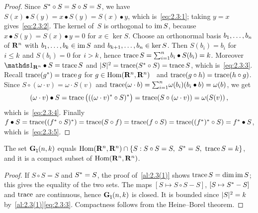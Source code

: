 \begin{proof}
    Since $S^{*} \circ S = S \circ S = S$, we have $S(x) \bullet S(y) = x \bullet S(y) =
    S(x) \bullet y$, which is~\eqref{eq:2.3:1}; taking $y = x$ gives~\eqref{eq:2.3:2}. The
    kernel of~$S$ is orthogonal to $\operatorname{im} S$, because $x \bullet S(y) = S(x) \bullet y = 0$ for $x
    \in \ker S$. Choose an orthonormal basis $b_1, \ldots, b_{n}$ of $\mathbf{R}^{n}$ with $b_1,
    \ldots, b_{k} \in \operatorname{im} S$ and $b_{k+1}, \ldots, b_{n} \in \ker S$. Then $S(b_i) =
    b_i$ for $i \le k$ and $S(b_i) = 0$ for $i > k$, hence $\operatorname{trace} S = {\textstyle\sum_{i=1}^{n}}
    b_i \bullet S(b_i) = k$. Moreover $\id{\R^{\adim}} \bullet S = \trace S$ and $|S|^2 =
    \operatorname{trace}(S^{*} \circ S) = \operatorname{trace} S$, which is~\eqref{eq:2.3:3}. Recall $\operatorname{trace}
    (g^{*}) = \operatorname{trace} g$ for $g \in \operatorname{Hom}(\mathbf{R}^{n},\mathbf{R}^{n})$~\cite[1.7.6]{Federer1969}
    and $\operatorname{trace}(g \circ h) = \operatorname{trace}(h \circ g)$. Since $S \circ (\omega \cdot v) = \omega \cdot
    S(v)$ and $\operatorname{trace}(\omega \cdot b) = {\textstyle\sum_{i=1}^{n}} \omega(b_i) (b_i \bullet b) =
    \omega(b)$, we get
    \begin{displaymath}
        (\omega \cdot v) \bullet S = \operatorname{trace} \big( ((\omega \cdot v)^{*} \circ
        S)^{*} \big) = \operatorname{trace}(S \circ (\omega \cdot v)) = \omega(S(v)) \,,
    \end{displaymath}
    which is~\eqref{eq:2.3:4}. Finally $f \bullet S = \operatorname{trace}((f^{*} \circ S)^{*})
    = \operatorname{trace}(S \circ f) = \operatorname{trace}(f \circ S) = \operatorname{trace}((f^{*})^{*} \circ S) =
    f^{*} \bullet S$, which is~\eqref{eq:2.3:5}.
\end{proof}

\begin{lemma}[new\MS]
    \label{new:grass_compact}
    The set $\mathbf{G}_{\natural}(n,k)$ equals $\operatorname{Hom}(\mathbf{R}^{n},\mathbf{R}^{n}) \cap \{ S : S \circ S =
    S,\ S^{*} = S,\ \operatorname{trace} S = k \}$, and it is a compact subset of
    $\operatorname{Hom}(\mathbf{R}^{n},\mathbf{R}^{n})$.
\end{lemma}

\begin{proof}
    If $S \circ S = S$ and $S^{*} = S$, the proof of~\ref{al:2.3(1)} shows $\operatorname{trace} S =
    \dim \operatorname{im} S$; this gives the equality of the two sets. The maps $[S \mapsto S \circ S - S]$,
    $[S \mapsto S^{*} - S]$ and $\operatorname{trace}$ are continuous, hence $\mathbf{G}_{\natural}(n,k)$ is
    closed. It is bounded since $|S|^2 = k$ by~\ref{al:2.3(1)}\eqref{eq:2.3:3}. Compactness
    follows from the Heine--Borel theorem.
\end{proof}

